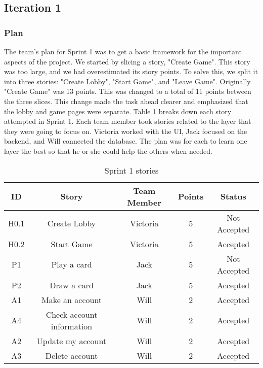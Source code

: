 \subsection{Iteration 1}

\subsubsection{Plan}
The team's plan for Sprint 1 was to get a basic framework for the important aspects of the project. We started by slicing a story, "Create Game". This story was too large, and we had overestimated its story points. To solve this, we split it into three stories: "Create Lobby", "Start Game", and "Leave Game". Originally "Create Game" was 13 points. This was changed to a total of 11 points between the three slices. This change made the task ahead clearer and emphasized that the lobby and game pages were separate. Table \ref{Table 2} breaks down each story attempted in Sprint 1. Each team member took stories related to the layer that they were going to focus on. Victoria worked with the UI, Jack focused on the backend, and Will connected the database. The plan was for each to learn one layer the best so that he or she could help the others when needed.

\begin{table}[h]
\centering
\begin{tabular}{|c|c|c|c|c|}
\hline
\textbf{ID} & \textbf{Story}            & \textbf{Team Member} & \textbf{Points} & \textbf{Status} \\ \hline
H0.1 & Create Lobby              & Victoria    & 5      & Not Accepted \\ \hline
H0.2 & Start Game                & Victoria    & 5      & Accepted     \\ \hline
P1   & Play a card               & Jack        & 5      & Not Accepted \\ \hline
P2   & Draw a card               & Jack        & 5      & Accepted     \\ \hline
A1   & Make an account           & Will        & 2      & Accepted     \\ \hline
A4   & Check account information & Will        & 2      & Accepted     \\ \hline
A2   & Update my account         & Will        & 2      & Accepted     \\ \hline
A3   & Delete account            & Will        & 2      & Accepted     \\ \hline
\end{tabular}
\caption{Sprint 1 stories}
\label{Table 2}
\end{table}


